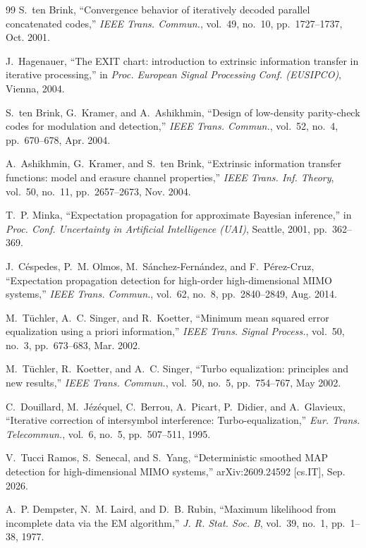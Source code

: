 \documentclass[11pt,a4paper]{article}
\theoremstyle{definition}
\theoremstyle{remark}
\begin{document}
\begin{thebibliography}{99}
S.~ten Brink, ``Convergence behavior of iteratively decoded parallel concatenated codes,'' \emph{IEEE Trans. Commun.}, vol.~49, no.~10, pp.~1727--1737, Oct. 2001.

J.~Hagenauer, ``The EXIT chart: introduction to extrinsic information transfer in iterative processing,'' in \emph{Proc. European Signal Processing Conf. (EUSIPCO)}, Vienna, 2004.

S.~ten Brink, G.~Kramer, and A.~Ashikhmin, ``Design of low-density parity-check codes for modulation and detection,'' \emph{IEEE Trans. Commun.}, vol.~52, no.~4, pp.~670--678, Apr. 2004.

A.~Ashikhmin, G.~Kramer, and S.~ten Brink, ``Extrinsic information transfer functions: model and erasure channel properties,'' \emph{IEEE Trans. Inf. Theory}, vol.~50, no.~11, pp.~2657--2673, Nov. 2004.

T.~P. Minka, ``Expectation propagation for approximate Bayesian inference,'' in \emph{Proc. Conf. Uncertainty in Artificial Intelligence (UAI)}, Seattle, 2001, pp.~362--369.

J.~C\'espedes, P.~M. Olmos, M.~S\'anchez-Fern\'andez, and F.~P\'erez-Cruz, ``Expectation propagation detection for high-order high-dimensional MIMO systems,'' \emph{IEEE Trans. Commun.}, vol.~62, no.~8, pp.~2840--2849, Aug. 2014.

M.~T\"uchler, A.~C. Singer, and R.~Koetter, ``Minimum mean squared error equalization using a priori information,'' \emph{IEEE Trans. Signal Process.}, vol.~50, no.~3, pp.~673--683, Mar. 2002.

M.~T\"uchler, R.~Koetter, and A.~C. Singer, ``Turbo equalization: principles and new results,'' \emph{IEEE Trans. Commun.}, vol.~50, no.~5, pp.~754--767, May 2002.

C.~Douillard, M.~J\'ez\'equel, C.~Berrou, A.~Picart, P.~Didier, and A.~Glavieux, ``Iterative correction of intersymbol interference: Turbo-equalization,'' \emph{Eur. Trans. Telecommun.}, vol.~6, no.~5, pp.~507--511, 1995.

V.~Tucci Ramos, S.~Senecal, and S.~Yang, ``Deterministic smoothed MAP detection for high-dimensional MIMO systems,'' arXiv:2609.24592 [cs.IT], Sep. 2026.

A.~P. Dempster, N.~M. Laird, and D.~B. Rubin, ``Maximum likelihood from incomplete data via the EM algorithm,'' \emph{J. R. Stat. Soc. B}, vol.~39, no.~1, pp.~1--38, 1977.

\end{thebibliography}
\end{document}
